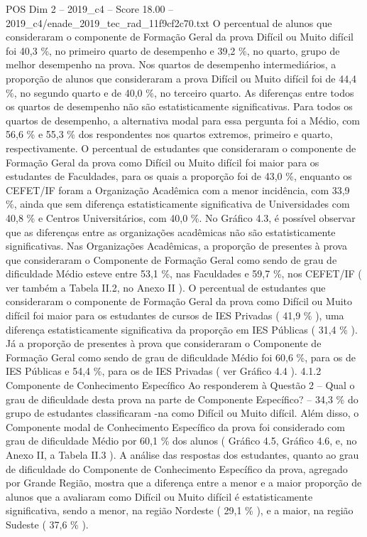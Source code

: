 \begin{textsample}{POS Dim 2 – 2019\_c4 – Score 18.00 – 2019\_c4/enade\_2019\_tec\_rad\_11f9cf2c70.txt}
O percentual de alunos que consideraram o componente de Formação Geral da prova Difícil ou Muito difícil foi 40,3 \%, no primeiro quarto de desempenho e 39,2 \%, no quarto, grupo de melhor desempenho na prova.
Nos quartos de desempenho intermediários, a proporção de alunos que consideraram a prova Difícil ou Muito difícil foi de 44,4 \%, no segundo quarto e de 40,0 \%, no terceiro quarto.
As diferenças entre todos os quartos de desempenho não são estatisticamente significativas.
Para todos os quartos de desempenho, a alternativa modal para essa pergunta foi a Médio, com 56,6 \% e 55,3 \% dos respondentes nos quartos extremos, primeiro e quarto, respectivamente.
O percentual de estudantes que consideraram o componente de Formação Geral da prova como Difícil ou Muito difícil foi maior para os estudantes de Faculdades, para os quais a proporção foi de 43,0 \%, enquanto os CEFET/IF foram a Organização Acadêmica com a menor incidência, com 33,9 \%, ainda que sem diferença estatisticamente significativa de Universidades com 40,8 \% e Centros Universitários, com 40,0 \%.
No Gráfico 4.3, é possível observar que as diferenças entre as organizações acadêmicas não são estatisticamente significativas.
Nas Organizações Acadêmicas, a proporção de presentes à prova que consideraram o Componente de Formação Geral como sendo de grau de dificuldade Médio esteve entre 53,1 \%, nas Faculdades e 59,7 \%, nos CEFET/IF ( ver também a Tabela II.2, no Anexo II ).
O percentual de estudantes que consideraram o componente de Formação Geral da prova como Difícil ou Muito difícil foi maior para os estudantes de cursos de IES Privadas ( 41,9 \% ), uma diferença estatisticamente significativa da proporção em IES Públicas ( 31,4 \% ).
Já a proporção de presentes à prova que consideraram o Componente de Formação Geral como sendo de grau de dificuldade Médio foi 60,6 \%, para os de IES Públicas e 54,4 \%, para os de IES Privadas ( ver Gráfico 4.4 ). 4.1.2 Componente de Conhecimento Específico Ao responderem à Questão 2 – Qual o grau de dificuldade desta prova na parte de Componente Específico? – 34,3 \% do grupo de estudantes classificaram -na como Difícil ou Muito difícil.
Além disso, o Componente modal de Conhecimento Específico da prova foi considerado com grau de dificuldade Médio por 60,1 \% dos alunos ( Gráfico 4.5, Gráfico 4.6, e, no Anexo II, a Tabela II.3 ).
A análise das respostas dos estudantes, quanto ao grau de dificuldade do Componente de Conhecimento Específico da prova, agregado por Grande Região, mostra que a diferença entre a menor e a maior proporção de alunos que a avaliaram como Difícil ou Muito difícil é estatisticamente significativa, sendo a menor, na região Nordeste ( 29,1 \% ), e a maior, na região Sudeste ( 37,6 \% ).

\end{textsample}
